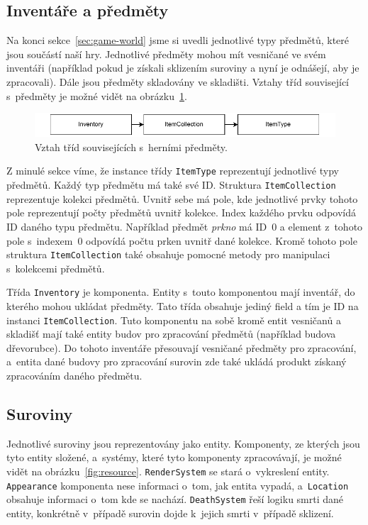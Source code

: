\subsection{Inventáře a předměty}
Na konci sekce~\ref{sec:game-world} jsme si uvedli jednotlivé typy předmětů, které jsou součástí naší hry. Jednotlivé předměty mohou mít vesničané ve svém inventáři (například pokud je získali sklizením suroviny a nyní je odnášejí, aby je zpracovali). Dále jsou předměty skladovány ve skladišti. Vztahy tříd související s~předměty je možné vidět na obrázku~\ref{fig:items}.

\begin{figure}[!htb]
  \centering
  \includegraphics[width=0.8\linewidth]{img/items.pdf}
  \caption{Vztah tříd souvisejících s~herními předměty.}
  \label{fig:items}
\end{figure}

Z minulé sekce víme, že instance třídy \texttt{ItemType} reprezentují jednotlivé typy předmětů. Každý typ předmětu má také své ID. Struktura \texttt{ItemCollection} reprezentuje kolekci předmětů. Uvnitř sebe má pole, kde jednotlivé prvky tohoto pole reprezentují počty předmětů uvnitř kolekce. Index každého prvku odpovídá ID daného typu předmětu. Například předmět \textit{prkno} má ID~0 a element z~tohoto pole s~indexem~0 odpovídá počtu prken uvnitř dané kolekce. Kromě tohoto pole struktura \texttt{ItemCollection} také obsahuje pomocné metody pro manipulaci s~kolekcemi předmětů.

Třída \texttt{Inventory} je komponenta. Entity s~touto komponentou mají inventář, do kterého mohou ukládat předměty. Tato třída obsahuje jediný field a tím je ID na instanci \texttt{ItemCollection}. Tuto komponentu na sobě kromě entit vesničanů a skladišť mají také entity budov pro zpracování předmětů (například budova dřevorubce). Do tohoto inventáře přesouvají vesničané předměty pro zpracování, a~entita dané budovy pro zpracování surovin zde také ukládá produkt získaný zpracováním daného předmětu.

\subsection{Suroviny}
\label{sec:res-impl}
Jednotlivé suroviny jsou reprezentovány jako entity. Komponenty, ze kterých jsou tyto entity složené, a~systémy, které tyto komponenty zpracovávají, je možné vidět na obrázku~\ref{fig:resource}. \texttt{RenderSystem} se stará o~vykreslení entity. \texttt{Appearance} komponenta nese informaci o~tom, jak entita vypadá, a~\texttt{Location} obsahuje informaci o~tom kde se nachází. \texttt{DeathSystem} řeší logiku smrti dané entity, konkrétně v~případě surovin dojde k~jejich smrti v~případě sklizení.

